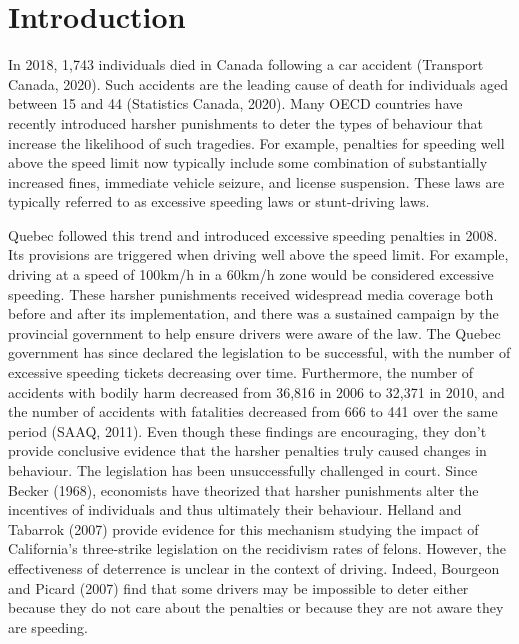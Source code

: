 \section{Introduction}
\label{sec:Introduction}

In 2018, 1,743 individuals died in Canada following a car accident (Transport Canada, 2020). Such accidents are the leading cause of death for individuals aged between 15 and 44 (Statistics Canada, 2020).  Many OECD countries have recently introduced harsher punishments to deter the types of behaviour that increase the likelihood of such tragedies. For example, penalties for speeding well above the speed limit now typically include some combination of substantially increased fines, immediate vehicle seizure, and license suspension. These laws are typically referred to as excessive speeding laws or stunt-driving laws.

Quebec followed this trend and introduced excessive speeding penalties in 2008. Its provisions are triggered when driving well above the speed limit. For example, driving at a speed of 100km/h in a 60km/h zone would be considered excessive speeding. These harsher punishments received widespread media coverage both before and after its implementation, and there was a sustained campaign by the provincial government to help ensure drivers were aware of the law. The Quebec government has since declared the legislation to be successful, with the number of excessive speeding tickets decreasing over time. Furthermore, the number of accidents with bodily harm decreased from 36,816 in 2006 to 32,371 in 2010, and the number of accidents with fatalities decreased from 666 to 441 over the same period (SAAQ, 2011). Even though these findings are encouraging, they don’t provide conclusive evidence that the harsher penalties truly caused changes in behaviour. The legislation has been unsuccessfully challenged in court.
Since Becker (1968), economists have theorized that harsher punishments alter the incentives of individuals and thus ultimately their behaviour. Helland and Tabarrok (2007) provide evidence for this mechanism studying the impact of California’s three-strike legislation on the recidivism rates of felons. However, the effectiveness of deterrence is unclear in the context of driving. Indeed, Bourgeon and Picard (2007) find that some drivers may be impossible to deter either because they do not care about the penalties or because they are not aware they are speeding.

